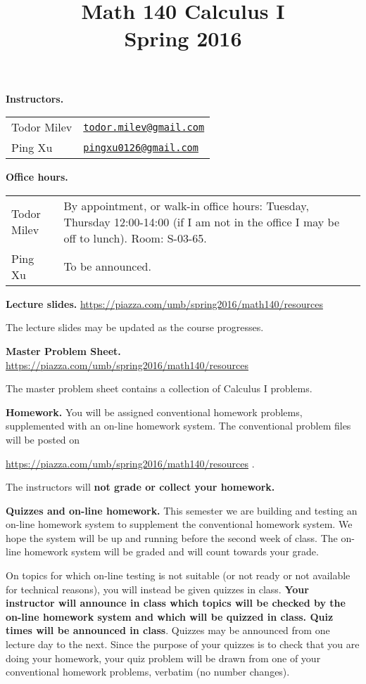 \documentclass{article}
\title{\vskip -2cm 
 Math 140 Calculus I \\ Spring 2016}
\date{}
\newcommand{\websitebase}{https://piazza.com/umb/spring2016/math140}
\begin{document}
\maketitle


\noindent \textbf{Instructors.} 
\begin{tabular}{ll}
Todor Milev & \href{mailto:todor.milev@gmail.com}{\nolinkurl{todor.milev@gmail.com}} \\
Ping Xu & \href{mailto:pingxu0126@gmail.com}{\nolinkurl{pingxu0126@gmail.com}} 
\end{tabular}

\medskip
\noindent \textbf{Office hours. } \begin{tabular}{lp{12cm}}
Todor Milev & By appointment, or walk-in office hours: Tuesday, Thursday 12:00-14:00 (if I am not in the office I may be off to lunch).  Room: S-03-65.\\
Ping Xu&  To be announced.
\end{tabular}





\medskip \noindent \textbf{Lecture slides. }  \url{\websitebase/resources}

\medskip\noindent The lecture slides may be updated as the course progresses.


\medskip \noindent \textbf{Master Problem Sheet. }  \url{\websitebase/resources} 

\medskip\noindent The master problem sheet contains a collection of Calculus I problems. 

\medskip
\noindent \textbf{Homework.} You will be assigned conventional homework problems, supplemented with an on-line homework system. The conventional problem files will be posted on

\url{\websitebase/resources} \quad \quad \quad .

\noindent  The instructors will \textbf{not grade or collect your homework.} 


\medskip
\noindent \textbf{Quizzes and on-line homework.} This semester we are building and testing an on-line homework system to supplement the conventional homework system. We hope the system will be up and running before the second week of class. The on-line homework system will be graded and will count towards your grade. 

On topics for which on-line testing is not suitable (or not ready or not available for technical reasons), you will instead be given quizzes in class. \textbf{Your instructor will announce in class which topics will be checked by the on-line homework system and which will be quizzed in class. Quiz times will be announced in class}. Quizzes may be announced from one lecture day to the next. Since the purpose of your quizzes is to check that you are doing your homework, your quiz problem will be drawn from one of your conventional homework problems, verbatim (no number changes). 
\end{document}
